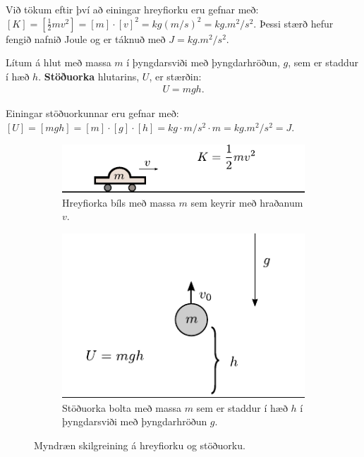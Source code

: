 Við tökum eftir því að einingar hreyfiorku eru gefnar með: $[K] = [\frac{1}{2}mv^2] = [m] \cdot [v]^2 = \si{kg (m/s)^2} = \si{kg.m^2/s^2}$. Þessi stærð hefur fengið nafnið Joule og er táknuð með $\si{J} = \si{kg.m^2/s^2}$.

\begin{tcolorbox}
\begin{definition}
Lítum á hlut með massa $m$ í þyngdarsviði með þyngdarhröðun, $g$, sem er staddur í hæð $h$.
\textbf{Stöðuorka} hlutarins, $U$, er stærðin:
\begin{align*}
    U = mgh.
\end{align*}
\end{definition}
\end{tcolorbox}
Einingar stöðuorkunnar eru gefnar með: $[U] = [mgh] = [m] \cdot [g] \cdot [h] = \si{kg} \cdot \si{m/s^2} \cdot \si{m} = \si{kg.m^2/s^2} = \si{J}$.

\begin{figure}[H]
    \centering
\begin{subfigure}[b]{.45\textwidth}
    \centering
    \includegraphics[scale = 1]{figures/hreyfiorka2.pdf}
    \caption{Hreyfiorka bíls með massa $m$ sem keyrir með hraðanum $v$.}
    \label{fig:hreyfiorka}
\end{subfigure}
\hfill
\begin{subfigure}[b]{.45\textwidth}
    \centering
    \includegraphics[scale = 1]{figures/stoduorkasimple.pdf}
    \caption{Stöðuorka bolta með massa $m$ sem er staddur í hæð $h$ í þyngdarsviði með þyngdarhröðun $g$.}
    \label{fig:stoduorkasimple}
\end{subfigure}
\caption{Myndræn skilgreining á hreyfiorku og stöðuorku.}
\end{figure}

